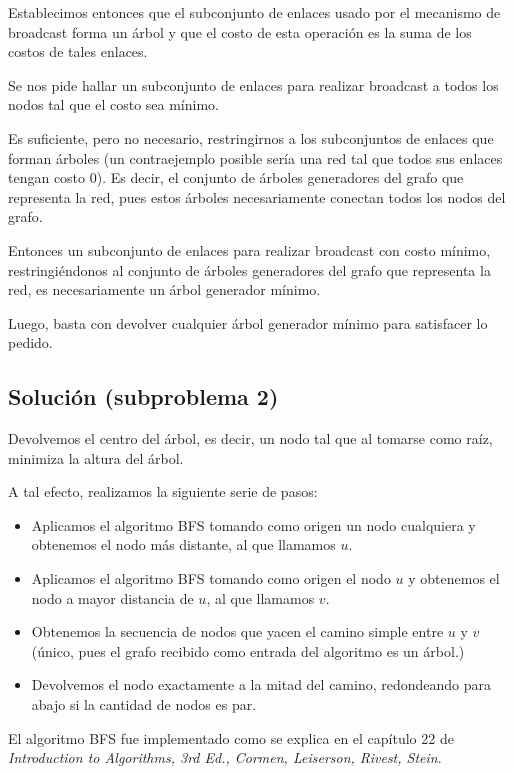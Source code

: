 \documentclass[a4paper, 10pt, twoside]{article}
\begin{document}
Establecimos entonces que el subconjunto de enlaces usado por el mecanismo de broadcast forma un árbol y que el costo de esta operación es la suma de los costos de tales enlaces. 

Se nos pide hallar un subconjunto de enlaces para realizar broadcast a todos los nodos tal que el costo sea mínimo.

Es suficiente, pero no necesario, restringirnos a los subconjuntos de enlaces que forman árboles (un contraejemplo posible sería una red tal que todos sus enlaces tengan costo 0). Es decir, el conjunto de árboles generadores del grafo que representa la red, pues estos árboles necesariamente conectan todos los nodos del grafo.

Entonces un subconjunto de enlaces para realizar broadcast con costo mínimo, restringiéndonos al conjunto de árboles generadores del grafo que representa la red, es necesariamente un árbol generador mínimo.

Luego, basta con devolver cualquier árbol generador mínimo para satisfacer lo pedido.


\subsection{Solución (subproblema 2)}

Devolvemos el centro del árbol, es decir, un nodo tal que al tomarse como raíz, minimiza la altura del árbol.

A tal efecto, realizamos la siguiente serie de pasos:

\begin{itemize}
  \item Aplicamos el algoritmo BFS tomando como origen un nodo cualquiera y obtenemos el nodo más distante, al que llamamos $u$.
  \item Aplicamos el algoritmo BFS tomando como origen el nodo $u$ y obtenemos el nodo a mayor distancia de $u$, al que llamamos $v$.
  \item Obtenemos la secuencia de nodos que yacen el camino simple entre $u$ y $v$ (único, pues el grafo recibido como entrada del algoritmo es un árbol.)
  \item Devolvemos el nodo exactamente a la mitad del camino, redondeando para abajo si la cantidad de nodos es par.
\end{itemize}

El algoritmo BFS fue implementado como se explica en el capítulo 22 de \textit{Introduction to Algorithms, 3rd Ed., Cormen, Leiserson, Rivest, Stein}.
\end{document}
